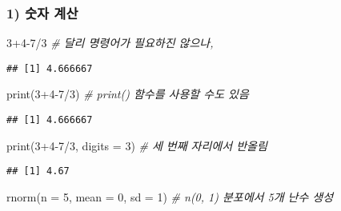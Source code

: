 \documentclass[
  12,
]{article}
\newenvironment{Shaded}{\begin{snugshade}}{\end{snugshade}}
\newcommand{\AttributeTok}[1]{\textcolor[rgb]{0.77,0.63,0.00}{#1}}
\newcommand{\CommentTok}[1]{\textcolor[rgb]{0.56,0.35,0.01}{\textit{#1}}}
\newcommand{\DecValTok}[1]{\textcolor[rgb]{0.00,0.00,0.81}{#1}}
\newcommand{\FunctionTok}[1]{\textcolor[rgb]{0.00,0.00,0.00}{#1}}
\newcommand{\NormalTok}[1]{#1}
\newcommand{\SpecialCharTok}[1]{\textcolor[rgb]{0.00,0.00,0.00}{#1}}
\begin{document}
\hypertarget{uxc22buxc790-uxacc4uxc0b0}{%
\subsubsection{1) 숫자 계산}\label{uxc22buxc790-uxacc4uxc0b0}}

\begin{Shaded}
\begin{Highlighting}[]
\DecValTok{3}\SpecialCharTok{+}\DecValTok{4{-}7}\SpecialCharTok{/}\DecValTok{3} \CommentTok{\# 달리 명령어가 필요하진 않으나,}
\end{Highlighting}
\end{Shaded}

\begin{verbatim}
## [1] 4.666667
\end{verbatim}

\begin{Shaded}
\begin{Highlighting}[]
\FunctionTok{print}\NormalTok{(}\DecValTok{3}\SpecialCharTok{+}\DecValTok{4{-}7}\SpecialCharTok{/}\DecValTok{3}\NormalTok{) }\CommentTok{\# print() 함수를 사용할 수도 있음}
\end{Highlighting}
\end{Shaded}

\begin{verbatim}
## [1] 4.666667
\end{verbatim}

\begin{Shaded}
\begin{Highlighting}[]
\FunctionTok{print}\NormalTok{(}\DecValTok{3}\SpecialCharTok{+}\DecValTok{4{-}7}\SpecialCharTok{/}\DecValTok{3}\NormalTok{, }\AttributeTok{digits =} \DecValTok{3}\NormalTok{) }\CommentTok{\# 세 번째 자리에서 반올림}
\end{Highlighting}
\end{Shaded}

\begin{verbatim}
## [1] 4.67
\end{verbatim}

\begin{Shaded}
\begin{Highlighting}[]
\FunctionTok{rnorm}\NormalTok{(}\AttributeTok{n =} \DecValTok{5}\NormalTok{, }\AttributeTok{mean =} \DecValTok{0}\NormalTok{, }\AttributeTok{sd =} \DecValTok{1}\NormalTok{) }\CommentTok{\# n(0, 1) 분포에서 5개 난수 생성}
\end{Highlighting}
\end{Shaded}
\end{document}
